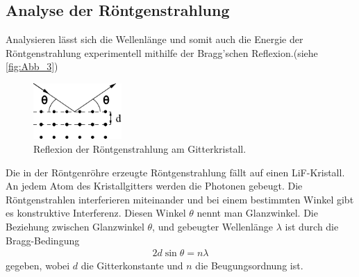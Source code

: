 
\subsection{Analyse der Röntgenstrahlung} %
\label{sub:Analyse}

Analysieren lässt sich die Wellenlänge und somit auch die Energie der Röntgenstrahlung experimentell mithilfe der
Bragg'schen Reflexion.(siehe \autoref{fig:Abb_3})
\begin{figure}[H]
    \centering
    \includegraphics[width=0.3\textwidth]{build/Abb_3.pdf}
    \caption{Reflexion der Röntgenstrahlung am Gitterkristall.\cite{V602}}
    \label{fig:Abb_3}
\end{figure}
Die in der Röntgenröhre erzeugte Röntgenstrahlung fällt auf einen LiF-Kristall. An jedem Atom des Kristallgitters werden die
Photonen gebeugt. Die Röntgenstrahlen interferieren miteinander und bei einem bestimmten Winkel gibt es konstruktive Interferenz.
Diesen Winkel $\theta$ nennt man Glanzwinkel.
Die Beziehung zwischen Glanzwinkel $\theta$, und gebeugter Wellenlänge $\lambda$ ist durch die Bragg-Bedingung
\begin{align}
    2 d \sin{\theta} = n \lambda \label{eqn:Bragg}
\end{align}
gegeben, wobei $d$ die Gitterkonstante und $n$ die Beugungsordnung ist.
